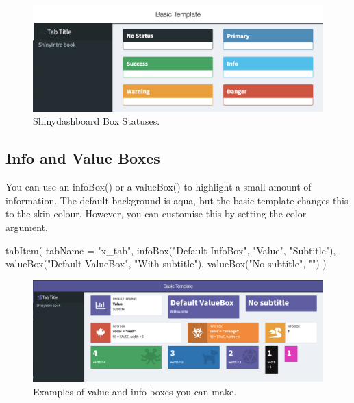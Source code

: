 \documentclass[
]{book}
\newenvironment{Shaded}{\begin{snugshade}}{\end{snugshade}}
\newcommand{\AttributeTok}[1]{\textcolor[rgb]{0.77,0.63,0.00}{#1}}
\newcommand{\FunctionTok}[1]{\textcolor[rgb]{0.00,0.00,0.00}{#1}}
\newcommand{\NormalTok}[1]{#1}
\newcommand{\StringTok}[1]{\textcolor[rgb]{0.31,0.60,0.02}{#1}}
\begin{document}
\begin{figure}

{\centering \includegraphics[width=1\linewidth]{images/sdb_box_status} 

}

\caption{Shinydashboard Box Statuses.}\label{fig:sdb-box-status}
\end{figure}

\hypertarget{info-and-value-boxes}{%
\subsection{Info and Value Boxes}\label{info-and-value-boxes}}

You can use an infoBox() or a valueBox() to highlight a small amount of information. The default background is aqua, but the basic template changes this to the skin colour. However, you can customise this by setting the color argument.

\begin{Shaded}
\begin{Highlighting}[]
\FunctionTok{tabItem}\NormalTok{(}
    \AttributeTok{tabName =} \StringTok{"x\_tab"}\NormalTok{,}
    \FunctionTok{infoBox}\NormalTok{(}\StringTok{"Default InfoBox"}\NormalTok{, }\StringTok{"Value"}\NormalTok{, }\StringTok{"Subtitle"}\NormalTok{),}
    \FunctionTok{valueBox}\NormalTok{(}\StringTok{"Default ValueBox"}\NormalTok{, }\StringTok{"With subtitle"}\NormalTok{),}
    \FunctionTok{valueBox}\NormalTok{(}\StringTok{"No subtitle"}\NormalTok{, }\StringTok{""}\NormalTok{)}
\NormalTok{)}
\end{Highlighting}
\end{Shaded}

\begin{figure}

{\centering \includegraphics[width=1\linewidth]{images/sdb_value_info} 

}

\caption{Examples of value and info boxes you can make.}\label{fig:sdb-value-info}
\end{figure}
\end{document}
